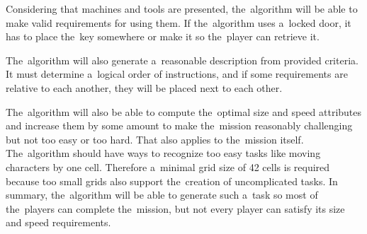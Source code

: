 Considering that machines and tools are presented,
the~algorithm will be able to make valid requirements for using them.
If the~algorithm uses a~locked door, it has to place the~key somewhere or make it so the~player can retrieve it.

The~algorithm will also generate a~reasonable description from provided criteria.
It must determine a~logical order of instructions, and if some requirements are relative to each another, they will be placed next to each other.

The~algorithm will also be able to compute the~optimal size and speed attributes and increase them by some amount to make the~mission reasonably challenging but not too easy or too hard.
That also applies to the~mission itself.
The~algorithm should have ways to recognize too easy tasks like moving characters by one cell.
Therefore a~minimal grid size of 42 cells is required because too small grids also support the~creation of uncomplicated tasks.
In summary, the~algorithm will be able to generate such a~task so most of the~players can complete the~mission, but not every player can satisfy its size and speed requirements.
